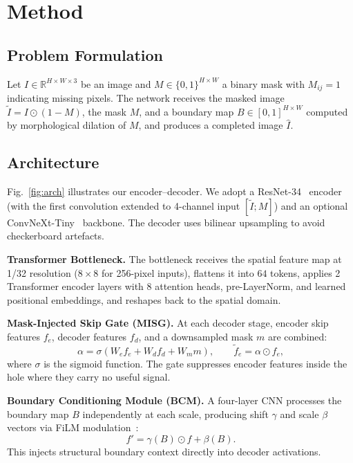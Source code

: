 \documentclass[10pt,conference]{IEEEtran}
\begin{document}
\section{Method}
\label{sec:method}

\subsection{Problem Formulation}
Let $I \in \mathbb{R}^{H \times W \times 3}$ be an image and
$M \in \{0,1\}^{H \times W}$ a binary mask with $M_{ij}=1$ indicating
missing pixels.  The network receives the masked image
$\tilde{I} = I \odot (1-M)$, the mask $M$, and a boundary map
$B \in [0,1]^{H \times W}$ computed by morphological dilation of $M$,
and produces a completed image $\hat{I}$.

\subsection{Architecture}
\label{sec:arch}

Fig.~\ref{fig:arch} illustrates our encoder--decoder.  We adopt a
ResNet-34~\cite{he2016deep} encoder (with the first convolution extended to
4-channel input $[\tilde{I}; M]$) and an optional ConvNeXt-Tiny~\cite{liu2022convnet}
backbone.  The decoder uses bilinear upsampling to avoid checkerboard artefacts.

\textbf{Transformer Bottleneck.}
The bottleneck receives the spatial feature map at 1/32 resolution
($8{\times}8$ for 256-pixel inputs), flattens it into $64$ tokens, applies
2 Transformer encoder layers with 8 attention heads, pre-LayerNorm, and
learned positional embeddings, and reshapes back to the spatial domain.

\textbf{Mask-Injected Skip Gate (MISG).}
At each decoder stage, encoder skip features $f_e$, decoder features $f_d$,
and a downsampled mask $m$ are combined:
\begin{equation}
  \alpha = \sigma\!\left(W_e f_e + W_d f_d + W_m m\right), \qquad
  \tilde{f}_e = \alpha \odot f_e,
  \label{eq:misg}
\end{equation}
where $\sigma$ is the sigmoid function.  The gate suppresses encoder features
inside the hole where they carry no useful signal.

\textbf{Boundary Conditioning Module (BCM).}
A four-layer CNN processes the boundary map $B$ independently at each scale,
producing shift $\gamma$ and scale $\beta$ vectors via FiLM modulation~\cite{perez2018film}:
\begin{equation}
  f' = \gamma(B) \odot f + \beta(B).
  \label{eq:film}
\end{equation}
This injects structural boundary context directly into decoder activations.
\end{document}
